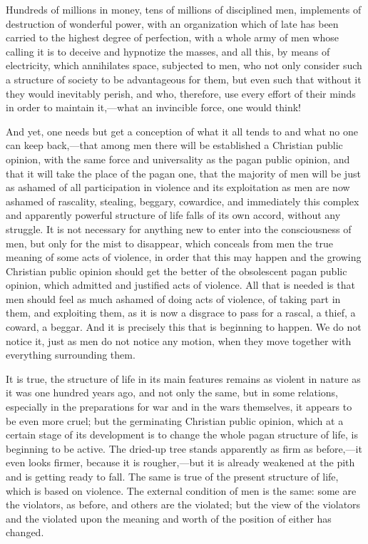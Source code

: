 \documentclass{book}
\begin{document}
Hundreds of millions in money, tens of millions of disciplined men, implements of destruction of wonderful power, with an organization which of late has been carried to the highest degree of perfection, with a whole army of men whose calling it is to deceive and hypnotize the masses, and all this, by means of electricity, which annihilates space, subjected to men, who not only consider such a structure of society to be advantageous for them, but even such that without it they would inevitably perish, and who, therefore, use every effort of their minds in order to maintain it,—what an invincible force, one would think!

And yet, one needs but get a conception of what it all tends to and what no one can keep back,—that among men there will be established a Christian public opinion, with the same force and universality as the pagan public opinion, and that it will take the place of the pagan one, that the majority of men will be just as ashamed of all participation in violence and its exploitation as men are now ashamed of rascality, stealing, beggary, cowardice, and immediately this complex and apparently powerful structure of life falls of its own accord, without any struggle. It is not necessary for anything new to enter into the consciousness of men, but only for the mist to disappear, which conceals from men the true meaning of some acts of violence, in order that this may happen and the growing Christian public opinion should get the better of the obsolescent pagan public opinion, which admitted and justified acts of violence. All that is needed is that men should feel as much ashamed of doing acts of violence, of taking part in them, and exploiting them, as it is now a disgrace to pass for a rascal, a thief, a coward, a beggar. And it is precisely this that is beginning to happen. We do not notice it, just as men do not notice any motion, when they move together with everything surrounding them.

It is true, the structure of life in its main features remains as violent in nature as it was one hundred years ago, and not only the same, but in some relations, especially in the preparations for war and in the wars themselves, it appears to be even more cruel; but the germinating Christian public opinion, which at a certain stage of its development is to change the whole pagan structure of life, is beginning to be active. The dried-up tree stands apparently as firm as before,—it even looks firmer, because it is rougher,—but it is already weakened at the pith and is getting ready to fall. The same is true of the present structure of life, which is based on violence. The external condition of men is the same: some are the violators, as before, and others are the violated; but the view of the violators and the violated upon the meaning and worth of the position of either has changed.
\end{document}
